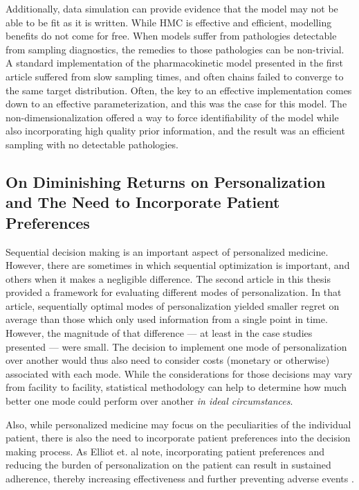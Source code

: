 Additionally, data simulation can provide evidence that the model may not be able to be fit as it is written.  While HMC is effective and efficient, modelling benefits do not come for free.  When models suffer from pathologies detectable from sampling diagnostics, the remedies to those pathologies can be non-trivial. A standard implementation of the pharmacokinetic model presented in the first article suffered from slow sampling times, and often chains failed to converge to the same target distribution.  Often, the key to an effective implementation comes down to an effective parameterization, and this was the case for this model.  The non-dimensionalization offered a way to force identifiability of the model while also incorporating high quality prior information, and the result was an efficient sampling with no detectable pathologies.

\subsection{On Diminishing Returns on Personalization and The Need to Incorporate Patient Preferences}

Sequential decision making is an important aspect of personalized medicine.  However, there are sometimes in which sequential optimization is important, and others when it makes a negligible difference.  The second article in this thesis  provided a framework for evaluating different modes of personalization.  In that article, sequentially optimal modes of personalization yielded smaller regret on average than those which only used information from a single point in time.  However, the magnitude of that difference --- at least in the case studies presented --- were small.  The decision to implement one mode of personalization over another would thus also need to consider costs (monetary or otherwise) associated with each mode. While the considerations for those decisions may vary from facility to facility, statistical methodology can help to determine how much better one mode could perform over another \textit{in ideal circumstances}.

Also, while personalized medicine may focus on the peculiarities of the individual patient, there is also the need to incorporate patient preferences into the decision making process.  As Elliot et. al note, incorporating patient preferences and reducing the burden of personalization on the patient can result in sustained adherence, thereby increasing effectiveness and further preventing adverse events \cite{elliott2008understanding}.  

